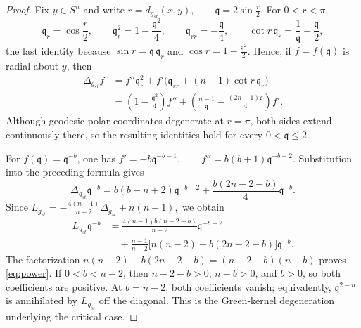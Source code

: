 \documentclass[12pt,oneside,a4paper]{article}
\theoremstyle{mytheorem}
\theoremstyle{remark}
\theoremstyle{definition}
\begin{document}
\begin{proof}
Fix $y\in S^n$ and write
$r=d_{g_{st}}(x,y),\qquad \mathfrak q=2\sin\frac r2$.
For $0<r<\pi$,
\[
 \mathfrak q_r=\cos\frac r2,\qquad
 \mathfrak q_r^2=1-\frac{\mathfrak q^2}{4},\qquad
 \mathfrak q_{rr}=-\frac{\mathfrak q}{4},
 \qquad
 \cot r\,\mathfrak q_r=\frac1{\mathfrak q}-\frac{\mathfrak q}{2},
\]
the last identity because $\sin r=\mathfrak q\,\mathfrak q_r$ and $\cos r=1-\tfrac{\mathfrak q^2}2$.
Hence, if $f=f(\mathfrak q)$ is radial about $y$, then
\begin{align*}
 \Delta_{g_{st}}f
 &=f''\mathfrak q_r^2+f'\bigl(\mathfrak q_{rr}+(n-1)\cot r\,\mathfrak q_r\bigr)\\
 &=\left(1-\frac{\mathfrak q^2}{4}\right)f''
   +\left(\frac{n-1}{\mathfrak q}-\frac{(2n-1)\mathfrak q}{4}\right)f'.
\end{align*}
Although geodesic polar coordinates degenerate at $r=\pi$, both sides
extend continuously there, so the resulting identities hold for every
$0<\mathfrak q\le2$.

For $f(\mathfrak q)=\mathfrak q^{-b}$, one has
$f'=-b\mathfrak q^{-b-1},\qquad
f''=b(b+1)\mathfrak q^{-b-2}$.
Substitution into the preceding formula gives
\[
 \Delta_{g_{st}}\mathfrak q^{-b}
 =b(b-n+2)\mathfrak q^{-b-2}
  +\frac{b(2n-2-b)}4\mathfrak q^{-b}.
\]
Since
$L_{g_{st}}=-\frac{4(n-1)}{n-2}\Delta_{g_{st}}+n(n-1),$
we obtain
\begin{align*}
 L_{g_{st}}\mathfrak q^{-b}
 &=\frac{4(n-1)b(n-2-b)}{n-2}\mathfrak q^{-b-2}\\
 &\quad+
 \frac{n-1}{n-2}
 \bigl[n(n-2)-b(2n-2-b)\bigr]\mathfrak q^{-b}.
\end{align*}
The factorization
$n(n-2)-b(2n-2-b)=(n-2-b)(n-b)$
proves \eqref{eq:power}.  If $0<b<n-2$, then
$n-2-b>0$, $n-b>0$, and $b>0$, so both coefficients are positive.
At $b=n-2$, both coefficients vanish; equivalently,
$\mathfrak q^{2-n}$ is annihilated by $L_{g_{st}}$ off the diagonal.
This is the Green-kernel degeneration underlying the critical case.


\end{proof}
\end{document}
